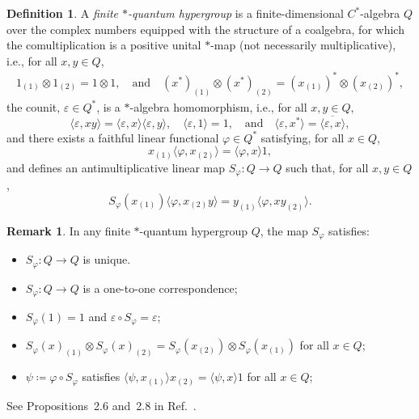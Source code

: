 \documentclass[a4paper,10pt]{amsart}
\newcommand{\eval}[2]{\langle #1 , #2\rangle}
\newcommand{\newterm}[1]{\emph{#1}}
\theoremstyle{definition}
\newtheorem{definition}[theorem]{Definition}
\newtheorem{remark}[theorem]{Remark}
\begin{document}
\begin{definition}
    \label{def:qHG}
    A \newterm{finite $*$-quantum hypergroup} is a finite-dimensional $C^*$-al\-ge\-bra $Q$ over the complex numbers equipped with the structure of a coalgebra, for which the co\-multi\-pli\-ca\-tion is a positive unital $*$-map (not necessarily multiplicative), i.e., for all $x,y\in Q$,
	\begin{gather}
        \label{eq:DeltaHypergroup}
        1_{(1)}\otimes 1_{(2)}
        =
        1\otimes 1,
        \quad
        \text{and}
        \quad
        (x^*)_{(1)}\otimes (x^*)_{(2)}
        =
        (x_{(1)})^* \otimes (x_{(2)})^*,
    \end{gather}
	the counit, $\varepsilon\in Q^*$, is a $*$-algebra homomorphism, i.e., for all $x,y\in Q$,
	\begin{equation}
        \label{eq:axiom_eps_Hypergroup}
        \eval{\varepsilon}{xy} = \eval{\varepsilon}{x}\eval{\varepsilon}{y},
        \quad
        \eval{\varepsilon}{1}= 1,
        \quad 
        \text{and}
        \quad
        \eval{\varepsilon}{x^*}
        =
        \overline{\eval{\varepsilon}{x}},
    \end{equation}
    and there exists a faithful linear functional $\varphi\in Q^*$ satisfying, for all $x\in Q$,
    \begin{equation}
    x_{(1)} \eval{\varphi}{x_{(2)}} = \eval{\varphi}{x} 1,
    \end{equation}
    and defines an antimultiplicative linear map $S_\varphi:Q\to Q$ such that, for all $x,y\in Q$,
    \begin{equation}
        S_\varphi(x_{(1)}) \eval{\varphi}{x_{(2)} y}
        =
        y_{(1)} \eval{\varphi}{x y_{(2)}}.
    \end{equation}
\end{definition}

\begin{remark}
In any finite $*$-quantum hypergroup $Q$, the map $S_\varphi$ satisfies:
\begin{itemize}
    \item[(i)] $S_\varphi: Q \to Q$ is unique.
    \item[(ii)] $S_\varphi: Q \to Q$ is a one-to-one correspondence;
    \item[(iii)] $S_\varphi(1) = 1$ and $\varepsilon \circ S_\varphi = \varepsilon$;
    \item[(iv)] $S_\varphi(x)_{(1)}\otimes S_\varphi(x)_{(2)}= S_\varphi(x_{(2)})\otimes S_\varphi(x_{(1)})$ for all $x\in Q$;
    \item[(v)] $\psi \coloneqq \varphi\circ S_\varphi$ satisfies $\eval{\psi}{x_{(1)}} x_{(2)} = \eval{\psi}{x}1$ for all $x\in Q$;
\end{itemize}
See Propositions~2.6 and~2.8 in Ref.~\cite{landstad_finite_2025}.
\end{remark}
\end{document}
